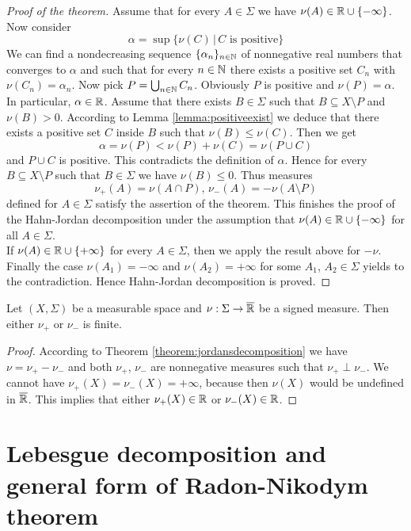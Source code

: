 \begin{proof}[Proof of the theorem]
Assume that for every $A\in \Sigma$ we have $\nu(A) \in {\mathbb R}\cup \{-\infty\}$. Now consider 
$$\alpha=\sup \big\{\nu(C)\,\big|\,C\mbox{ is positive}\big\}$$
We can find a nondecreasing sequence $\{\alpha_n\}_{n\in {\mathbb N}}$ of nonnegative real numbers that converges to $\alpha$ and such that for every $n\in {\mathbb N}$ there exists a positive set $C_n$ with $\nu(C_n)=\alpha_n$. Now pick $P=\bigcup_{n\in {\mathbb N}}C_n$. Obviously $P$ is positive and $\nu(P)=\alpha$. In particular, $\alpha \in {\mathbb R}$. Assume that there exists $B\in \Sigma$ such that $B\subseteq X\setminus P$ and $\nu(B)>0$. According to Lemma \ref{lemma:positiveexist} we deduce that there exists a positive set $C$ inside $B$ such that $\nu(B)\leq \nu(C)$. Then we get
$$\alpha=\nu(P)<\nu(P)+\nu(C)=\nu(P\cup C)$$
and $P\cup C$ is positive. This contradicts the definition of $\alpha$. Hence for every $B\subseteq X\setminus P$ such that $B\in \Sigma$ we have $\nu(B)\leq 0$. Thus measures
$$\nu_+(A) = \nu(A\cap P),\,\nu_-(A) = -\nu(A\setminus P)$$
defined for $A\in \Sigma$ satisfy the assertion of the theorem. This finishes the proof of the Hahn-Jordan decomposition under the assumption that $\nu(A)\in {\mathbb R}\cup \{-\infty\}$ for all $A\in \Sigma$.\\
If $\nu(A)\in {\mathbb R}\cup \{+\infty\}$ for every $A\in \Sigma$, then we apply the result above for $-\nu$. Finally the case $\nu(A_1)=-\infty$ and $\nu(A_2)=+\infty$ for some $A_1$, $A_2\in \Sigma$ yields to the contradiction. Hence Hahn-Jordan decomposition is proved.
\end{proof}



\begin{corollary}\label{corollary:oneisfinite}
Let $\left(X,\Sigma\right)$ be a measurable space and $\nu:\Sigma\rightarrow \overline{{\mathbb R}}$ be a signed measure. Then either $\nu_+$ or $\nu_-$ is finite.
\end{corollary}
\begin{proof}
According to Theorem \ref{theorem:jordansdecomposition} we have $\nu = \nu_+-\nu_-$ and both $\nu_+$, $\nu_-$ are nonnegative measures such that $\nu_+\perp \nu_-$. We cannot have $\nu_+(X)=\nu_-(X)=+\infty$, because then $\nu(X)$ would be undefined in $\overline{{\mathbb R}}$. This implies that either $\nu_+(X)\in {\mathbb R}$ or $\nu_-(X)\in {\mathbb R}$.
\end{proof}

\section{Lebesgue decomposition and general form of Radon-Nikodym theorem}

